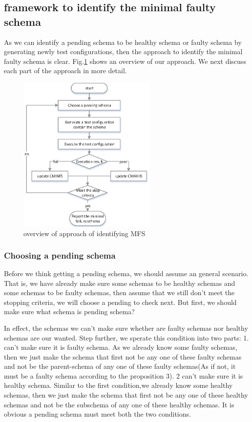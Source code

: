 \documentclass[10pt,journal,cspaper,compsoc]{IEEEtran}
\begin{document}
\subsection{framework to identify the minimal faulty schema}
As we can identify a pending schema to be healthy schema or faulty schema by generating newly test configurations, then the approach to identify the minimal faulty schema is clear. Fig.\ref{fig_overview} shows an overview of our approach. We next discuss each part of the approach in more detail.
\begin{figure}
 \centering
 \includegraphics[width=2.7in]{gp.eps}
 \caption{overview of approach of identifying MFS}
 \label{fig_overview}
\end{figure}
\subsubsection{Choosing a pending schema}
Before we think getting a pending schema, we should assume an general scenario. That is, we have already make sure some schemas to be healthy schemas and some schemas to be faulty schemas, then assume that we still don't meet the stopping criteria, we will choose a pending to check next. But first, we should make sure what schema is pending schema?

In effect, the schemas we can't make sure whether are faulty schemas nor healthy schemas are our wanted. Step further, we sperate this condition into two parts: 1. can't make sure it is faulty schema. As we already know some faulty schemas, then we just make the schema that first not be any one of these faulty schemas and not be the parent-schema of any one of these faulty schemas(As if not, it must be a faulty schema according to the proposition 3). 2 can't make sure it is healthy schema. Similar to the first condition,we already know some healthy schemas, then we just make the schema that first not be any one of these healthy schemas and not be the subschema of any one of these healthy schemas. It is obvious a pending schema must meet both the two conditions.
\end{document}
